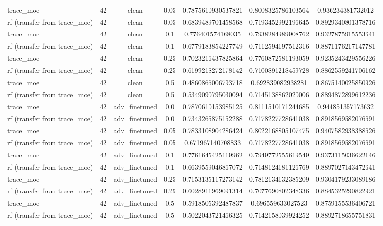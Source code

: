 \begin{table}[htbp]
\begin{tabular}{lcccccc}
trace\_moe & 42 & clean & 0.05 & 0.7875610930537821 & 0.8008325786103564 & 0.936234381732012 \\
rf (transfer from trace\_moe) & 42 & clean & 0.05 & 0.6839489701458568 & 0.7193452992196645 & 0.8929340801378716 \\
trace\_moe & 42 & clean & 0.1 & 0.776401574168035 & 0.7938284989908762 & 0.9327875915553641 \\
rf (transfer from trace\_moe) & 42 & clean & 0.1 & 0.6779183854227749 & 0.7112594197512316 & 0.8871176217147781 \\
trace\_moe & 42 & clean & 0.25 & 0.7023216437825864 & 0.7760872581193059 & 0.9235243429556226 \\
rf (transfer from trace\_moe) & 42 & clean & 0.25 & 0.6199218272178142 & 0.7100891218459728 & 0.8862559241706162 \\
trace\_moe & 42 & clean & 0.5 & 0.4860866006793718 & 0.692839082938281 & 0.8675140025850926 \\
rf (transfer from trace\_moe) & 42 & clean & 0.5 & 0.5349090795030094 & 0.7145138862020006 & 0.8894872899612236 \\
trace\_moe & 42 & adv\_finetuned & 0.0 & 0.7870610153985125 & 0.8111510171244685 & 0.944851357173632 \\
rf (transfer from trace\_moe) & 42 & adv\_finetuned & 0.0 & 0.7343265875152288 & 0.7178227728641038 & 0.8918569582076691 \\
trace\_moe & 42 & adv\_finetuned & 0.05 & 0.7833108904286424 & 0.8022168805107475 & 0.9407582938388626 \\
rf (transfer from trace\_moe) & 42 & adv\_finetuned & 0.05 & 0.671967140708833 & 0.7178227728641038 & 0.8918569582076691 \\
trace\_moe & 42 & adv\_finetuned & 0.1 & 0.7761645425119962 & 0.7949772555619549 & 0.9373115036622146 \\
rf (transfer from trace\_moe) & 42 & adv\_finetuned & 0.1 & 0.6639559046867072 & 0.7148124181126769 & 0.8897027143472641 \\
trace\_moe & 42 & adv\_finetuned & 0.25 & 0.7153135117273142 & 0.7812134132385209 & 0.9304179233089186 \\
rf (transfer from trace\_moe) & 42 & adv\_finetuned & 0.25 & 0.6028911969091314 & 0.7077690802348336 & 0.8845325290822921 \\
trace\_moe & 42 & adv\_finetuned & 0.5 & 0.5918505392487837 & 0.696559633027523 & 0.8759155536406721 \\
rf (transfer from trace\_moe) & 42 & adv\_finetuned & 0.5 & 0.5022043721466325 & 0.7142158039924252 & 0.8892718655751831 \\

\end{tabular}
\end{table}
